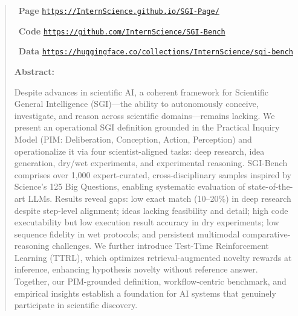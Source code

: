 \begin{abstract}

\vspace{-0.6cm}

\homepage\ \textbf{Page} \texttt{\url{https://InternScience.github.io/SGI-Page/}}

\github\ \textbf{Code} \texttt{\url{https://github.com/InternScience/SGI-Bench}}

\huggingface\ \textbf{Data} \texttt{\url{https://huggingface.co/collections/InternScience/sgi-bench}}

\vspace{0.2cm}

\textbf{Abstract:}

Despite advances in scientific AI, a coherent framework for Scientific General Intelligence (SGI)—the ability to autonomously conceive, investigate, and reason across scientific domains—remains lacking. 
We present an operational SGI definition grounded in the Practical Inquiry Model (PIM: Deliberation, Conception, Action, Perception) and operationalize it via four scientist-aligned tasks: deep research, idea generation, dry/wet experiments, and experimental reasoning. 
SGI-Bench comprises over 1,000 expert-curated, cross-disciplinary samples inspired by Science's 125 Big Questions, enabling systematic evaluation of state-of-the-art LLMs. Results reveal gaps: low exact match (10--20\%) in deep research despite step-level alignment; ideas lacking feasibility and detail; high code executability but low execution result accuracy in dry experiments; low sequence fidelity in wet protocols; and persistent multimodal comparative-reasoning challenges. 
We further introduce Test-Time Reinforcement Learning (TTRL), which optimizes retrieval-augmented novelty rewards at inference, enhancing hypothesis novelty without reference answer. 
Together, our PIM-grounded definition, workflow-centric benchmark, and empirical insights establish a foundation for AI systems that genuinely participate in scientific discovery.



\end{abstract}